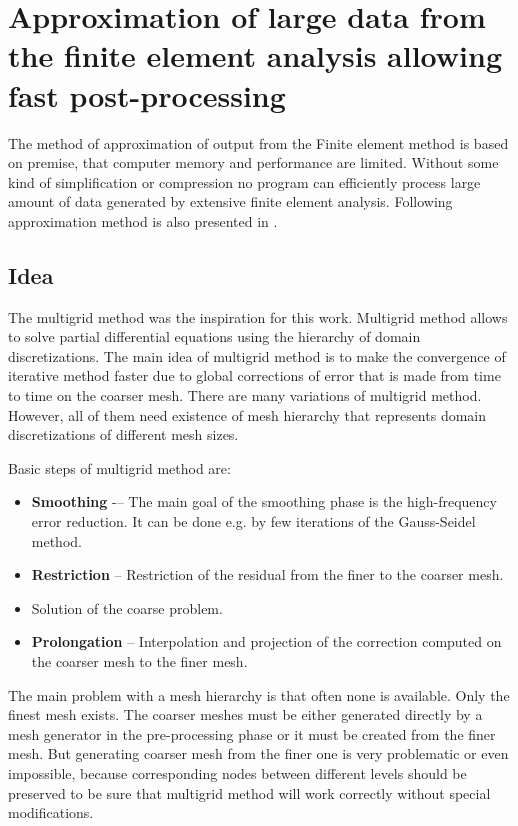 \chapter{Approximation of large data from the finite element analysis allowing fast post-processing}
\label{appendix-approximation}

The method of approximation of output from the Finite element method is based on premise, that computer memory and performance are limited. Without some kind of simplification or compression no program can efficiently process large amount of data generated by extensive finite element analysis. Following approximation method is also presented in \cite{Benes2016}.


\section{Idea}

The multigrid method \cite{XXX6-9} was the inspiration for this work. Multigrid method allows to solve partial differential equations using the hierarchy of domain discretizations. The main idea of multigrid method is to make the convergence of iterative method faster due to global corrections of error that is made from time to time on the coarser mesh. There are many variations of multigrid method. However, all of them need existence of mesh hierarchy that represents domain discretizations of different mesh sizes.

Basic steps of multigrid method are:

\begin{itemize}
    \item \textbf{Smoothing} -– The main goal of the smoothing phase is the high-frequency error reduction. It can be done e.g. by few iterations of the Gauss-Seidel method.
    \item \textbf{Restriction} -- Restriction of the residual from the finer to the coarser mesh.
    \item Solution of the coarse problem.
    \item \textbf{Prolongation} -- Interpolation and projection of the correction computed on the coarser mesh to the finer mesh.
\end{itemize}

The main problem with a mesh hierarchy is that often none is available. Only the finest mesh exists. The coarser meshes must be either generated directly by a mesh generator \cite{XXX-10, XXX-11} in the pre-processing phase or it must be created from the finer mesh. But generating coarser mesh from the finer one is very problematic or even impossible, because corresponding nodes between different levels should be preserved to be sure that multigrid method will work correctly without special modifications.

